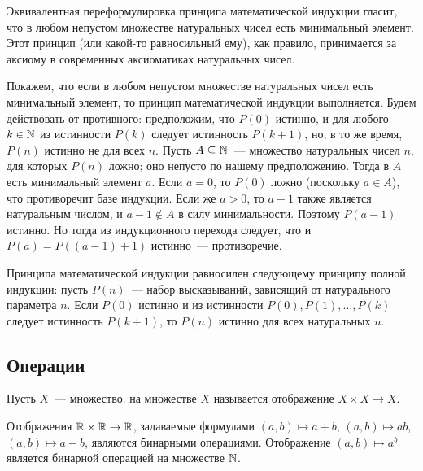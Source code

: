 Эквивалентная переформулировка принципа математической индукции
гласит, что в любом непустом множестве натуральных чисел есть
минимальный элемент. Этот принцип (или какой-то равносильный ему), как
правило, принимается за аксиому в современных аксиоматиках натуральных
чисел.

Покажем, что если в любом непустом множестве натуральных чисел есть
минимальный элемент, то принцип математической индукции
выполняется. Будем действовать от противного: предположим, что $P(0)$
истинно, и для любого $k\in\mathbb N$ из истинности $P(k)$ следует
истинность $P(k+1)$, но, в то же время, $P(n)$ истинно не для всех
$n$. Пусть $A\subseteq\mathbb N$~--- множество натуральных чисел $n$, для
которых $P(n)$ ложно; оно непусто по нашему предположению.
Тогда в $A$ есть минимальный элемент $a$. Если $a=0$, то $P(0)$ ложно
(поскольку $a\in A$), что противоречит базе индукции. Если же $a>0$,
то $a-1$ также является натуральным числом, и $a-1\notin A$ в силу
минимальности. Поэтому $P(a-1)$ истинно. Но тогда из индукционного
перехода следует, что и $P(a) = P((a-1)+1)$ истинно~--- противоречие.

Принципа математической индукции равносилен следующему
принципу полной индукции: пусть
$P(n)$~--- набор высказываний, зависящий от натурального параметра
$n$. Если $P(0)$ истинно и из истинности $P(0), P(1),\dots,P(k)$
следует истинность $P(k+1)$, то $P(n)$ истинно для всех натуральных $n$.

\subsection{Операции}


\begin{definition}
Пусть $X$~--- множество.  на множестве $X$
называется отображение $X\times X\to X$.
\end{definition}

\begin{examples}
Отображения $\mathbb R\times\mathbb R\to\mathbb R$, задаваемые формулами
$(a,b)\mapsto a+b$, $(a,b)\mapsto ab$, $(a,b)\mapsto a-b$, являются
бинарными операциями. Отображение $(a,b)\mapsto a^b$ является бинарной
операцией на множестве $\mathbb N$.
\end{examples}

